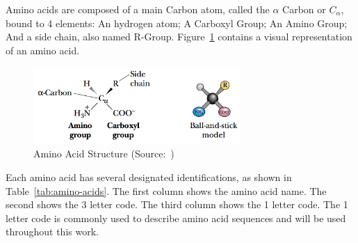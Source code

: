 Amino acids are composed of a main Carbon atom, called the $\alpha$ Carbon
or $C_\alpha$, bound to 4 elements: An hydrogen atom; A Carboxyl Group; An
Amino Group; And a side chain, also named R-Group.
Figure~\ref{fig:amino-acid-structure} contains a visual representation of
an amino acid.

\begin{figure}
    \centering
    \includegraphics[width=0.7\textwidth]{Figuras/amino-acid.png}
    \caption{Amino Acid Structure (Source:~\cite{garrett1999biochemistry})}
    \label{fig:amino-acid-structure}
\end{figure}

Each amino acid has several designated identifications, as shown in
Table~\ref{tab:amino-acids}. The first column shows the amino acid name.
The second shows the 3 letter code. The third column shows the 1 letter code.
The 1 letter code is commonly used to describe amino acid sequences and
will be used throughout this work.

